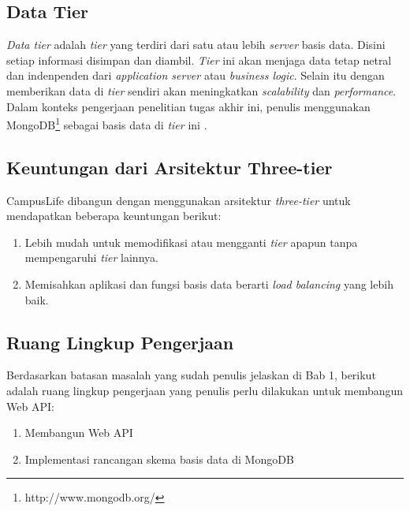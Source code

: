 \documentclass[a4paper, 12pt, oneside]{report}
\begin{document}
\subsection{Data Tier}
\onehalfspacing \textit{Data tier} adalah \textit{tier} yang terdiri dari satu atau lebih \textit{server} basis data. Disini setiap informasi disimpan dan diambil. \textit{Tier} ini akan menjaga data tetap netral dan indenpenden dari \textit{application server} atau \textit{business logic}. Selain itu dengan memberikan data di \textit{tier} sendiri akan meningkatkan \textit{scalability} dan \textit{performance}. Dalam konteks pengerjaan penelitian tugas akhir ini, penulis menggunakan MongoDB\footnote{http://www.mongodb.org/} sebagai basis data di \textit{tier} ini \cite{multitier-architecture-wikipedia}.

\subsection{Keuntungan dari Arsitektur Three-tier}
\onehalfspacing CampusLife dibangun dengan menggunakan arsitektur \textit{three-tier} untuk mendapatkan beberapa keuntungan berikut:

\begin{enumerate}
  \item Lebih mudah untuk memodifikasi atau mengganti \textit{tier} apapun tanpa mempengaruhi \textit{tier} lainnya.
  \item Memisahkan aplikasi dan fungsi basis data berarti \textit{load balancing} yang lebih baik.
\end{enumerate}

\subsection{Ruang Lingkup Pengerjaan}
\onehalfspacing Berdasarkan batasan masalah yang sudah penulis jelaskan di Bab 1, berikut adalah ruang lingkup pengerjaan yang penulis perlu dilakukan untuk membangun Web API:
\begin{enumerate}
  \item Membangun Web API
  \item Implementasi rancangan skema basis data di MongoDB
\end{enumerate}
\end{document}
